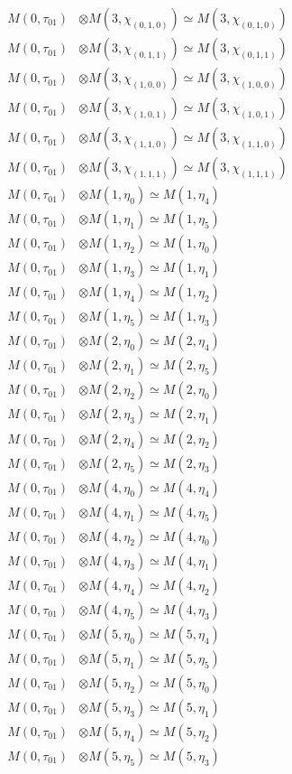 \begin{align*}
M(0,\tau_{01}) &\otimes M(3,\chi_{(0,1,0)}) \simeq M(3,\chi_{(0,1,0)}) \\
M(0,\tau_{01}) &\otimes M(3,\chi_{(0,1,1)}) \simeq M(3,\chi_{(0,1,1)}) \\
M(0,\tau_{01}) &\otimes M(3,\chi_{(1,0,0)}) \simeq M(3,\chi_{(1,0,0)}) \\
M(0,\tau_{01}) &\otimes M(3,\chi_{(1,0,1)}) \simeq M(3,\chi_{(1,0,1)}) \\
M(0,\tau_{01}) &\otimes M(3,\chi_{(1,1,0)}) \simeq M(3,\chi_{(1,1,0)}) \\
M(0,\tau_{01}) &\otimes M(3,\chi_{(1,1,1)}) \simeq M(3,\chi_{(1,1,1)}) \\
M(0,\tau_{01}) &\otimes M(1,\eta_{0}) \simeq M(1,\eta_{4}) \\
M(0,\tau_{01}) &\otimes M(1,\eta_{1}) \simeq M(1,\eta_{5}) \\
M(0,\tau_{01}) &\otimes M(1,\eta_{2}) \simeq M(1,\eta_{0}) \\
M(0,\tau_{01}) &\otimes M(1,\eta_{3}) \simeq M(1,\eta_{1}) \\
M(0,\tau_{01}) &\otimes M(1,\eta_{4}) \simeq M(1,\eta_{2}) \\
M(0,\tau_{01}) &\otimes M(1,\eta_{5}) \simeq M(1,\eta_{3}) \\
M(0,\tau_{01}) &\otimes M(2,\eta_{0}) \simeq M(2,\eta_{4}) \\
M(0,\tau_{01}) &\otimes M(2,\eta_{1}) \simeq M(2,\eta_{5}) \\
M(0,\tau_{01}) &\otimes M(2,\eta_{2}) \simeq M(2,\eta_{0}) \\
M(0,\tau_{01}) &\otimes M(2,\eta_{3}) \simeq M(2,\eta_{1}) \\
M(0,\tau_{01}) &\otimes M(2,\eta_{4}) \simeq M(2,\eta_{2}) \\
M(0,\tau_{01}) &\otimes M(2,\eta_{5}) \simeq M(2,\eta_{3}) \\
M(0,\tau_{01}) &\otimes M(4,\eta_{0}) \simeq M(4,\eta_{4}) \\
M(0,\tau_{01}) &\otimes M(4,\eta_{1}) \simeq M(4,\eta_{5}) \\
M(0,\tau_{01}) &\otimes M(4,\eta_{2}) \simeq M(4,\eta_{0}) \\
M(0,\tau_{01}) &\otimes M(4,\eta_{3}) \simeq M(4,\eta_{1}) \\
M(0,\tau_{01}) &\otimes M(4,\eta_{4}) \simeq M(4,\eta_{2}) \\
M(0,\tau_{01}) &\otimes M(4,\eta_{5}) \simeq M(4,\eta_{3}) \\
M(0,\tau_{01}) &\otimes M(5,\eta_{0}) \simeq M(5,\eta_{4}) \\
M(0,\tau_{01}) &\otimes M(5,\eta_{1}) \simeq M(5,\eta_{5}) \\
M(0,\tau_{01}) &\otimes M(5,\eta_{2}) \simeq M(5,\eta_{0}) \\
M(0,\tau_{01}) &\otimes M(5,\eta_{3}) \simeq M(5,\eta_{1}) \\
M(0,\tau_{01}) &\otimes M(5,\eta_{4}) \simeq M(5,\eta_{2}) \\
M(0,\tau_{01}) &\otimes M(5,\eta_{5}) \simeq M(5,\eta_{3}) \\
\end{align*}

